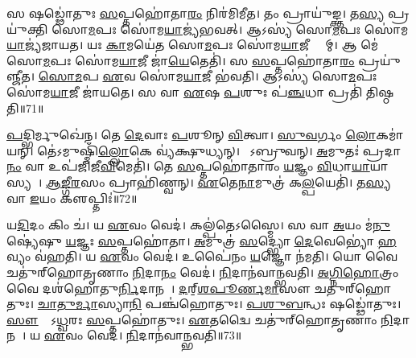 𑌸 𑌷𑌡𑍍𑌢𑍋॑𑌤𑍁𑌃 \ul{𑌸}𑌪𑍍𑌤𑌹𑍋॑𑌤𑌾\ul{𑌰𑌂} 𑌨𑌿𑌰॑𑌮𑌿𑌮𑍀𑌤।
𑌤𑌂 𑌪𑍍𑌰𑌾𑌯𑍁॑𑌙𑍍𑌕𑍍𑌤।
𑌤\ul{𑌸𑍍𑌯} 𑌪𑍍𑌰𑌯𑍁॑𑌕𑍍𑌤𑌿 𑌸𑍋\ul{𑌮}𑌪𑌃 𑌸𑍋॑𑌮\ul{𑌯𑌾}𑌜𑍍𑌯॑𑌭𑌵𑌤𑍍।
𑌆𑌽𑌸𑍍𑌯॑ 𑌸𑍋\ul{𑌮}𑌪𑌃 𑌸𑍋॑𑌮\ul{𑌯𑌾}𑌜𑍍𑌯॑𑌜𑌾𑌯𑌤।
𑌯𑌃 \ul{𑌕𑌾}𑌮𑌯𑍇॑𑌤 𑌸𑍋\ul{𑌮}𑌪𑌃 𑌸𑍋॑𑌮\ul{𑌯𑌾}𑌜𑍀 𑌸𑍍𑌯𑌾᳚𑌮𑍍।
𑌆 𑌮𑍇॑ 𑌸𑍋\ul{𑌮}𑌪𑌃 𑌸𑍋॑𑌮\ul{𑌯𑌾}𑌜𑍀 𑌜𑌾॑\ul{𑌯𑍇}𑌤𑍇𑌤𑌿॑।
𑌸 \ul{𑌸}𑌪𑍍𑌤𑌹𑍋॑𑌤𑌾\ul{𑌰𑌂} 𑌪𑍍𑌰𑌯𑍁॑𑌞𑍍𑌜𑍀𑌤।
\ul{𑌸𑍋}\ul{𑌮}𑌪 \ul{𑌏}𑌵 𑌸𑍋॑𑌮\ul{𑌯𑌾}𑌜𑍀 𑌭॑𑌵𑌤𑌿।
𑌆𑌽𑌸𑍍𑌯॑ 𑌸𑍋\ul{𑌮}𑌪𑌃 𑌸𑍋॑𑌮\ul{𑌯𑌾}𑌜𑍀 𑌜𑌾॑𑌯𑌤𑍇।
𑌸 𑌵𑌾 \ul{𑌏}𑌷 \ul{𑌪}𑌶𑍁𑌃 𑌪॑\ul{𑌞𑍍𑌚}𑌧𑌾 𑌪𑍍𑌰𑌤𑌿॑ 𑌤𑌿𑌷𑍍𑌠𑌤𑌿॥71॥

\ul{𑌪}𑌦𑍍𑌭𑌿𑌰𑍍𑌮𑍁𑌖𑍇॑𑌨।
𑌤𑍇 \ul{𑌦𑍇}𑌵𑌾𑌃 \ul{𑌪}𑌶𑍂𑌨𑍍 \ul{𑌵𑌿}𑌤𑍍𑌵𑌾।
\ul{𑌸𑍁}\ul{𑌵}𑌰𑍍𑌗𑌂 \ul{𑌲𑍋}𑌕𑌮𑌾॑𑌯𑌨𑍍।
𑌤𑍇॑𑌽𑌮𑍁𑌷𑍍𑌮𑌿𑌁॑\ul{𑌲𑍍𑌲𑍋}𑌕𑍇 𑌵𑍍𑌯॑𑌕𑍍𑌷𑍁𑌧𑍍𑌯𑌨𑍍।
𑌤𑍇᳚𑌽𑌬𑍍𑌰𑍁𑌵𑌨𑍍।
\ul{𑌅}𑌮𑍁𑌤𑌃॑ 𑌪𑍍𑌰𑌦𑌾\ul{𑌨𑌂} 𑌵𑌾 𑌉𑌪॑𑌜𑌿𑌜𑍀\ul{𑌵𑌿}𑌮𑍇𑌤𑌿॑।
𑌤𑍇 \ul{𑌸}𑌪𑍍𑌤𑌹𑍋॑𑌤𑌾𑌰𑌂 \ul{𑌯}𑌜𑍍𑌞𑌂 \ul{𑌵𑌿}𑌧𑌾\ul{𑌯𑌾}𑌯𑌾𑌸𑍍𑌯𑌮𑍍᳚।
\ul{𑌆}\ul{𑌙𑍍𑌗𑍀}\ul{𑌰}𑌸𑌂 𑌪𑍍𑌰𑌾𑌹𑌿॑𑌣𑍍𑌵𑌨𑍍।
\ul{𑌏}𑌤𑍇\ul{𑌨𑌾}𑌮𑍁𑌤𑍍𑌰॑ 𑌕\ul{𑌲𑍍𑌪}𑌯𑍇𑌤𑌿॑।
𑌤\ul{𑌸𑍍𑌯} 𑌵𑌾 \ul{𑌇}𑌯𑌂 𑌕𑍢𑌪𑍍𑌤𑌿𑌃॑॥72॥

𑌯\ul{𑌦𑌿}𑌦𑌂 𑌕𑌿𑌂 𑌚॑।
𑌯 \ul{𑌏}𑌵𑌂 𑌵𑍇𑌦॑।
𑌕𑌲𑍍𑌪॑𑌤𑍇\-𑌽𑌸𑍍𑌮𑍈।
𑌸 𑌵𑌾 \ul{𑌅}𑌯𑌂 𑌮॑\ul{𑌨𑍁}𑌷𑍍𑌯𑍇॑𑌷𑍁 \ul{𑌯}𑌜𑍍𑌞𑌃 \ul{𑌸}𑌪𑍍𑌤𑌹𑍋॑𑌤𑌾।
\ul{𑌅}𑌮𑍁𑌤𑍍𑌰॑ \ul{𑌸}𑌦𑍍𑌭𑍍𑌯𑍋 \ul{𑌦𑍇}𑌵𑍇𑌭𑍍𑌯𑍋॑ \ul{𑌹}𑌵𑍍𑌯𑌂 𑌵॑𑌹𑌤𑌿।
𑌯 \ul{𑌏}𑌵𑌂 𑌵𑍇𑌦॑।
𑌉𑌪𑍈॑𑌨𑌂 \ul{𑌯}𑌜𑍍𑌞𑍋 𑌨॑𑌮𑌤𑌿।
𑌯𑍋 𑌵𑍈 𑌚𑌤𑍁॑𑌰𑍍‌\mbox{}𑌹𑍋𑌤𑍃𑌣𑌾𑌂 \ul{𑌨𑌿}𑌦𑌾\ul{𑌨𑌂} 𑌵𑍇𑌦॑।
\ul{𑌨𑌿}𑌦𑌾𑌨॑𑌵𑌾𑌨𑍍𑌭𑌵𑌤𑌿।
\ul{𑌅}\ul{𑌗𑍍𑌨𑌿}\ul{𑌹𑍋}𑌤𑍍𑌰𑌂 𑌵𑍈 𑌦𑌶॑𑌹𑍋𑌤𑍁\ul{𑌰𑍍𑌨𑌿}𑌦𑌾𑌨𑌮𑍍᳚।
\ul{𑌦}𑌰𑍍‌॒\mbox{}\ul{𑌶}\ul{𑌪𑍂}\ul{𑌰𑍍𑌣}\ul{𑌮𑌾}𑌸𑍗 𑌚𑌤𑍁॑𑌰𑍍‌\mbox{}𑌹𑍋𑌤𑍁𑌃।
\ul{𑌚𑌾}\ul{𑌤𑍁}\ul{𑌰𑍍𑌮𑌾}𑌸𑍍𑌯𑌾\ul{𑌨𑌿} 𑌪𑌞𑍍𑌚॑𑌹𑍋𑌤𑍁𑌃।
\ul{𑌪}\ul{𑌶𑍁}\ul{𑌬}𑌨𑍍𑌧𑌃 𑌷𑌡𑍍𑌢𑍋॑𑌤𑍁𑌃।
\ul{𑌸𑍗}𑌮𑍍𑌯𑍋᳚\-𑌽\ul{𑌧𑍍𑌵}𑌰𑌃 \ul{𑌸}𑌪𑍍𑌤𑌹𑍋॑𑌤𑍁𑌃।
\ul{𑌏}𑌤𑌦𑍍𑌵𑍈 𑌚𑌤𑍁॑𑌰𑍍‌\mbox{}𑌹𑍋𑌤𑍃𑌣𑌾𑌂 \ul{𑌨𑌿}𑌦𑌾𑌨𑌮𑍍᳚।
𑌯 \ul{𑌏}𑌵𑌂 𑌵𑍇𑌦॑।
\ul{𑌨𑌿}𑌦𑌾𑌨॑𑌵𑌾𑌨𑍍𑌭𑌵𑌤𑌿॥73॥\anuvakamend[\ul{𑌅}\ul{𑌮𑌿}\ul{𑌮𑍀}\ul{𑌤} 𑌤𑌂 𑌪𑍍𑌰𑌾𑌯𑍁॑\ul{𑌙𑍍𑌕𑍍𑌤} 𑌪𑌞𑍍𑌚॑𑌹𑍋𑌤𑌾\ul{𑌰𑌂} 𑌪𑍍𑌰 𑌯𑍁॑𑌞𑍍𑌜𑍀𑌤 𑌜𑌾\ul{𑌯𑍇}𑌤𑍇𑌤𑌿॑ 𑌤𑌿𑌷𑍍𑌠\ul{𑌤𑌿} 𑌕𑍢\ul{𑌪𑍍𑌤𑌿}𑌰𑍍𑌦𑌶॑𑌹𑍋𑌤𑍁\ul{𑌰𑍍𑌨𑌿}𑌦𑌾𑌨\dng{ꣳ}॑ \ul{𑌸}𑌪𑍍𑌤 𑌚॑]




\clearpage
{}
\setcounter{anuvakam}{0}

